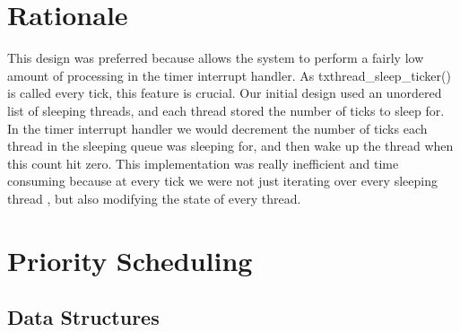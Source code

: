 \documentclass[a4wide, 11pt]{article}
\begin{document}
\section{Rationale}
This design was preferred because allows the system to perform a fairly low amount of processing in the timer interrupt handler. As tx{thread\_sleep\_ticker()} is called every tick, this feature is crucial. Our initial design used an unordered list of sleeping threads, and each thread stored the number of ticks to sleep for. In the timer interrupt handler we would decrement the number of ticks each thread in the sleeping queue was
sleeping for, and then wake up the thread when this count hit zero. This implementation was really inefficient and time consuming because at every tick we were not just iterating over every sleeping thread , but also modifying the state of every thread.
\newpage


\section{Priority Scheduling}
\subsection{Data Structures}
\end{document}
